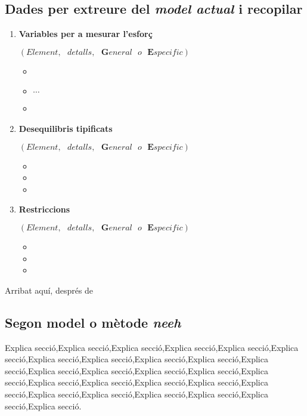 \documentclass[10pt]{proc}
\newcommand{\esp}{\text{ }}
\begin{document}
\subsection{Dades per extreure del \textit{model actual} i recopilar}
\begin{enumerate}
	\item \textbf{Variables per a mesurar l'esforç} 
	
	$(Element,\esp detalls,\esp  \textbf{G}eneral \esp o \esp \textbf{E}specific)$
	\begin{itemize}
		\item 
		\item $\cdots$
		\item 
	\end{itemize}
\item \textbf{Desequilibris tipificats}

	$(Element,\esp detalls,\esp  \textbf{G}eneral \esp o \esp \textbf{E}specific)$
\begin{itemize}
	\item 
	\item 
	\item 
\end{itemize}
\item \textbf{Restriccions}

$(Element,\esp detalls,\esp  \textbf{G}eneral \esp o \esp \textbf{E}specific)$
\begin{itemize}
	\item 
	\item 
	\item 
\end{itemize}
\end{enumerate}
Arribat aquí, després de 
\\
\newpage
\begin{tcolorbox}[colframe=white,colback=redviolet!20,sharp corners=all,size=minimal,halign=center,valign=center]
\section{Segon model o mètode \textit{neeh}}
\end{tcolorbox}
Explica secció,Explica secció,Explica secció,Explica secció,Explica secció,Explica secció,Explica secció,Explica secció,Explica secció,Explica secció,Explica secció,Explica secció,Explica secció,Explica secció,Explica secció,Explica secció,Explica secció,Explica secció,Explica secció,Explica secció,Explica secció,Explica secció,Explica secció,Explica secció,Explica secció,Explica secció,Explica secció.
\\
\end{document}
